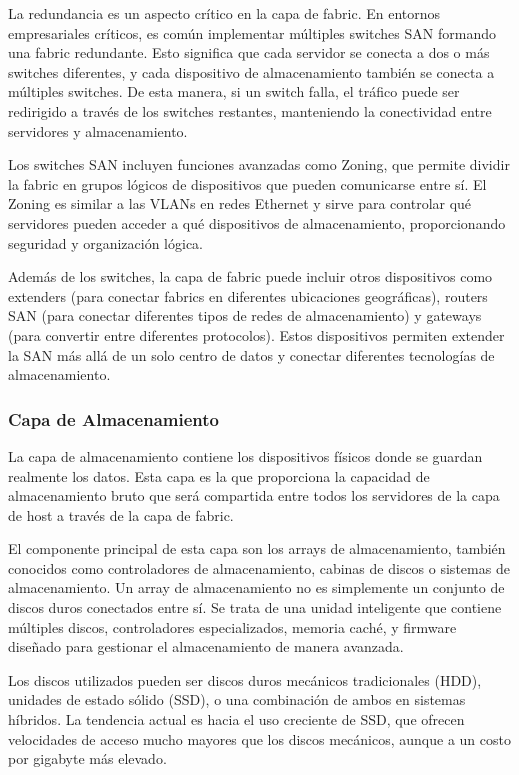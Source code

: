 La redundancia es un aspecto crítico en la capa de fabric. En entornos empresariales críticos, es común implementar múltiples switches SAN formando una fabric redundante. Esto significa que cada servidor se conecta a dos o más switches diferentes, y cada dispositivo de almacenamiento también se conecta a múltiples switches. De esta manera, si un switch falla, el tráfico puede ser redirigido a través de los switches restantes, manteniendo la conectividad entre servidores y almacenamiento.

Los switches SAN incluyen funciones avanzadas como Zoning, que permite dividir la fabric en grupos lógicos de dispositivos que pueden comunicarse entre sí. El Zoning es similar a las VLANs en redes Ethernet y sirve para controlar qué servidores pueden acceder a qué dispositivos de almacenamiento, proporcionando seguridad y organización lógica.

Además de los switches, la capa de fabric puede incluir otros dispositivos como extenders (para conectar fabrics en diferentes ubicaciones geográficas), routers SAN (para conectar diferentes tipos de redes de almacenamiento) y gateways (para convertir entre diferentes protocolos). Estos dispositivos permiten extender la SAN más allá de un solo centro de datos y conectar diferentes tecnologías de almacenamiento.

\subsubsection{Capa de Almacenamiento}
La capa de almacenamiento contiene los dispositivos físicos donde se guardan realmente los datos. Esta capa es la que proporciona la capacidad de almacenamiento bruto que será compartida entre todos los servidores de la capa de host a través de la capa de fabric.

El componente principal de esta capa son los arrays de almacenamiento, también conocidos como controladores de almacenamiento, cabinas de discos o sistemas de almacenamiento. Un array de almacenamiento no es simplemente un conjunto de discos duros conectados entre sí. Se trata de una unidad inteligente que contiene múltiples discos, controladores especializados, memoria caché, y firmware diseñado para gestionar el almacenamiento de manera avanzada.

Los discos utilizados pueden ser discos duros mecánicos tradicionales (HDD), unidades de estado sólido (SSD), o una combinación de ambos en sistemas híbridos. La tendencia actual es hacia el uso creciente de SSD, que ofrecen velocidades de acceso mucho mayores que los discos mecánicos, aunque a un costo por gigabyte más elevado.

